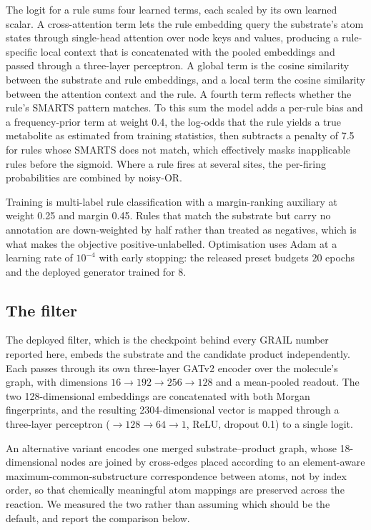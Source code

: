 The logit for a rule sums four learned terms, each scaled by its own learned scalar. A
cross-attention term lets the rule embedding query the substrate's atom states through
single-head attention over node keys and values, producing a rule-specific local context that is
concatenated with the pooled embeddings and passed through a three-layer perceptron. A global term
is the cosine similarity between the substrate and rule embeddings, and a local term the cosine
similarity between the attention context and the rule. A fourth term reflects whether the rule's
SMARTS pattern matches. To this sum the model adds a per-rule bias and a frequency-prior term at
weight 0.4, the log-odds that the rule yields a true metabolite as estimated from training
statistics, then subtracts a penalty of 7.5 for rules whose SMARTS does not match, which
effectively masks inapplicable rules before the sigmoid. Where a rule fires at several sites, the
per-firing probabilities are combined by noisy-OR.

Training is multi-label rule classification with a margin-ranking auxiliary at weight 0.25 and
margin 0.45. Rules that match the substrate but carry no annotation are down-weighted by half
rather than treated as negatives, which is what makes the objective positive-unlabelled.
Optimisation uses Adam at a learning rate of $10^{-4}$ with early stopping: the released
preset budgets $20$ epochs and the deployed generator trained for $8$.

\subsection{The filter}

The deployed filter, which is the checkpoint behind every GRAIL number reported here, embeds the
substrate and the candidate product independently. Each passes through its own three-layer GATv2
encoder over the molecule's graph, with dimensions $16\to192\to256\to128$ and a mean-pooled
readout. The two 128-dimensional embeddings are concatenated with both Morgan fingerprints, and
the resulting 2304-dimensional vector is mapped through a three-layer perceptron
($\to128\to64\to1$, ReLU, dropout 0.1) to a single logit.

An alternative variant encodes one merged substrate--product graph, whose 18-dimensional nodes
are joined by cross-edges placed according to an element-aware maximum-common-substructure
correspondence between atoms, not by index order, so that chemically meaningful atom
mappings are preserved across the reaction. We measured the two rather than assuming which should
be the default, and report the comparison below.

